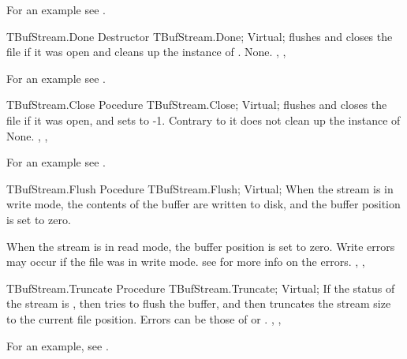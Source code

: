 For an example see .

\begin{procedure}{TBufStream.Done}
\Declaration
Destructor TBufStream.Done; Virtual;
\Description
{} flushes and closes the file if it was open and cleans up the 
instance of . 
\Errors
None.
\SeeAlso
{}, ,
\end{procedure}

For an example see .

\begin{procedure}{TBufStream.Close}
\Declaration
Pocedure TBufStream.Close; Virtual;
\Description
{} flushes and closes the file if it was open, and sets  to -1. 
Contrary to  it does not clean up the instance
of 
\Errors
None.
\SeeAlso
{}, ,
\end{procedure}

For an example see .

\begin{procedure}{TBufStream.Flush}
\Declaration
Pocedure TBufStream.Flush; Virtual;
\Description
When the stream is in write mode, the contents of the buffer are written to
disk, and the buffer position is set to zero.

When the stream is in read mode, the buffer position is set to zero.
\Errors
Write errors may occur if the file was in write mode.
see  for more info on the errors.
\SeeAlso
{}, ,
\end{procedure}



\begin{procedure}{TBufStream.Truncate}
\Declaration
Procedure TBufStream.Truncate; Virtual;
\Description
If the status of the stream is , then  tries to
flush the buffer, and then truncates the stream size to the current 
file position.
\Errors
Errors can be those of  or
.
\SeeAlso
{}, ,
\end{procedure}

For an example, see .

